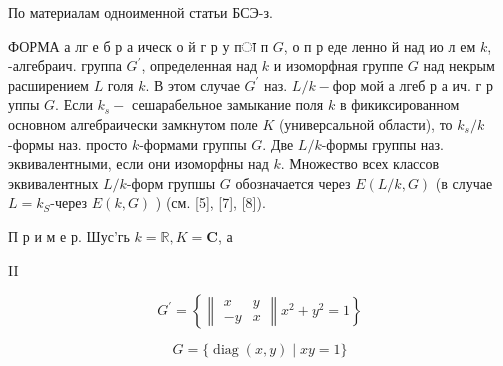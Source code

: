 \documentclass[10pt]{article}
\begin{document}
По материалам одноименной статьи БСЭ-з.



ФОРМА а лг е б р а ическ о й г р у пा п $G$, о п р еде ленно й над ио л ем $k$, -алгебраич. группа $G^{\prime}$, определенная над $k$ и изоморфная группе $G$ над некрым расширением $L$ голя $k$. В этом случае $G^{\prime}$ наз. $L / k-ф о р$ мой а лгеб р а ич. г р уппы $G$. Если $k_{s}-$ сешарабельное замыкание поля $k$ в фикиксированном основном алгебраически замкнутом поле $K$ (универсальной области), то $k_{s} / k$-формы наз. просто $k$-формами группы $G$. Две $L / k$-формы группы наз. эквивалентными, если они изоморфны над $k$. Множество всех классов эквивалентных $L / k$-форм групшы $G$ обозначается через $E(L / k, G)$ (в случае $L=k_{S}$-через $E(k, G)$ ) (см. [5], [7], [8]).



П р и м е р. Шус'гь $k=\mathbb{R}, K=\mathbf{C}$, а



II



\[

G^{\prime}=\left\{\left\|\begin{array}{rr}

x & y \\

-y & x

\end{array}\right\| x^{2}+y^{2}=1\right\}

\]



\[

G=\{\operatorname{diag}(x, y) \mid x y=1\}

\]
\end{document}
